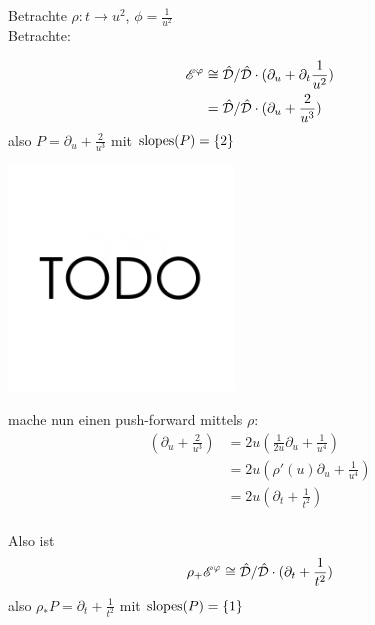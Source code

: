 \begin{exmp}
  Betrachte
  $\rho:t\rightarrow u^2$, $\phi=\frac{1}{u^2}$\\
  Betrachte:\\
  \begin{minipage}[hbt]{0,39\textwidth}
    \begin{align*}
      \mathscr{E}^\varphi &\cong\hat{\mathcal{D}}/\hat{\mathcal{D}}\cdot(\partial_u+\partial_t\frac{1}{u^2})\\
               &= \hat{\mathcal{D}}/\hat{\mathcal{D}}\cdot (\partial_u+\frac{2}{u^3})
    \end{align*}
    also $P=\partial_u+\frac{2}{u^3}$ 
    mit $ \operatorname{slopes}(P)=\{2\} $
  \end{minipage}
  \begin{minipage}[hbt]{0,59\textwidth}
    \begin{center}
      \includegraphics[width=6cm]{img/TODO.png}
    \end{center}
  \end{minipage}
  mache nun einen push-forward mittels $\rho$:
  \begin{align*}
    (\partial_u+\frac{2}{u^3}) &= 2u(\frac{1}{2u}\partial_u+\frac{1}{u^4}) \\
                               &= 2u(\rho'(u)\partial_u+\frac{1}{u^4}) \\
                               &= 2u(\partial_t+\frac{1}{t^2})\\
  \end{align*}
  \begin{minipage}[hbt]{0,39\textwidth}
    Also ist 
    \begin{align*}
      \rho_+\mathscr{E}^\varphi\cong \hat{\mathcal{D}}/\hat{\mathcal{D}}\cdot(\partial_t+\frac{1}{t^2})
    \end{align*}
    also $\rho_*P=\partial_t+\frac{1}{t^2}$ 
    mit $ \operatorname{slopes}(P)=\{1\} $
  \end{minipage}
  \begin{minipage}[hbt]{0,59\textwidth}

\end{minipage}
\end{exmp}
